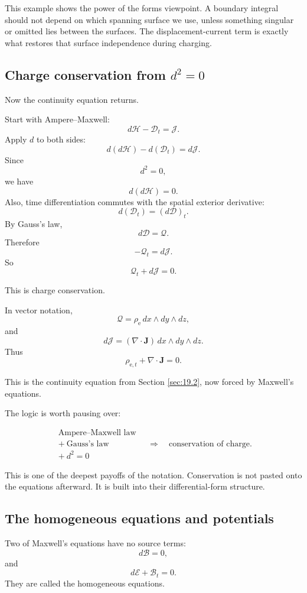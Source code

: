 This example shows the power of the forms viewpoint.  A boundary integral should not
depend on which spanning surface we use, unless something singular or omitted lies
between the surfaces.  The displacement-current term is exactly what restores that
surface independence during charging.

\subsection{Charge conservation from \texorpdfstring{\(d^2=0\)}{d squared equals zero}}

Now the continuity equation returns.

Start with Ampere--Maxwell:
\[
    d\mathcal H-\mathcal D_t=\mathcal J.
\]
Apply \(d\) to both sides:
\[
    d(d\mathcal H)-d(\mathcal D_t)=d\mathcal J.
\]
Since
\[
    d^2=0,
\]
we have
\[
    d(d\mathcal H)=0.
\]
Also, time differentiation commutes with the spatial exterior derivative:
\[
    d(\mathcal D_t)=(d\mathcal D)_t.
\]
By Gauss's law,
\[
    d\mathcal D=\mathcal Q.
\]
Therefore
\[
    -\mathcal Q_t=d\mathcal J.
\]
So
\[
\boxed{
    \mathcal Q_t+d\mathcal J=0.
}
\]

This is charge conservation.

In vector notation,
\[
\mathcal Q=\rho_{\mathrm e}\,dx\wedge dy\wedge dz,
\]
and
\[
d\mathcal J=(\nabla\cdot\mathbf J)\,dx\wedge dy\wedge dz.
\]
Thus
\[
\boxed{
    \rho_{\mathrm e,t}+\nabla\cdot\mathbf J=0.
}
\]

This is the continuity equation from Section \ref{sec:19.2}, now forced by Maxwell's
equations.

The logic is worth pausing over:

\[
\boxed{
\begin{array}{c}
\text{Ampere--Maxwell law}\\
+\ \text{Gauss's law}\\
+\ d^2=0
\end{array}
\quad\Longrightarrow\quad
\text{conservation of charge.}
}
\]

This is one of the deepest payoffs of the notation.  Conservation is not pasted onto the
equations afterward.  It is built into their differential-form structure.

\subsection{The homogeneous equations and potentials}

Two of Maxwell's equations have no source terms:
\[
    d\mathcal B=0,
\]
and
\[
    d\mathcal E+\mathcal B_t=0.
\]
They are called the homogeneous equations.

